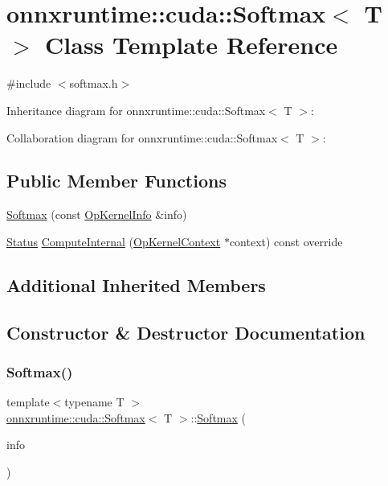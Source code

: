 \hypertarget{classonnxruntime_1_1cuda_1_1Softmax}{}\section{onnxruntime\+:\+:cuda\+:\+:Softmax$<$ T $>$ Class Template Reference}
\label{classonnxruntime_1_1cuda_1_1Softmax}


{\ttfamily \#include $<$softmax.\+h$>$}



Inheritance diagram for onnxruntime\+:\+:cuda\+:\+:Softmax$<$ T $>$\+:


Collaboration diagram for onnxruntime\+:\+:cuda\+:\+:Softmax$<$ T $>$\+:
\subsection*{Public Member Functions}
\begin{DoxyCompactItemize}
\item 
\mbox{\hyperlink{classonnxruntime_1_1cuda_1_1Softmax_a3e3037ed28e77d71dc1d32c1baf5437c}{Softmax}} (const \mbox{\hyperlink{classonnxruntime_1_1OpKernelInfo}{Op\+Kernel\+Info}} \&info)
\item 
\mbox{\hyperlink{classonnxruntime_1_1common_1_1Status}{Status}} \mbox{\hyperlink{classonnxruntime_1_1cuda_1_1Softmax_a729140e052a2639582dc42fd2ac915b0}{Compute\+Internal}} (\mbox{\hyperlink{classonnxruntime_1_1OpKernelContext}{Op\+Kernel\+Context}} $\ast$context) const override
\end{DoxyCompactItemize}
\subsection*{Additional Inherited Members}


\subsection{Constructor \& Destructor Documentation}
\mbox{\label{classonnxruntime_1_1cuda_1_1Softmax_a3e3037ed28e77d71dc1d32c1baf5437c}} 
\subsubsection{\texorpdfstring{Softmax()}{Softmax()}}
{\footnotesize\ttfamily template$<$typename T $>$ \\
\mbox{\hyperlink{classonnxruntime_1_1cuda_1_1Softmax}{onnxruntime\+::cuda\+::\+Softmax}}$<$ T $>$\+::\mbox{\hyperlink{classonnxruntime_1_1cuda_1_1Softmax}{Softmax}} (\begin{DoxyParamCaption}\item[{const \mbox{\hyperlink{classonnxruntime_1_1OpKernelInfo}{Op\+Kernel\+Info}} \&}]{info }\end{DoxyParamCaption})\hspace{0.3cm}{\ttfamily [inline]}}



